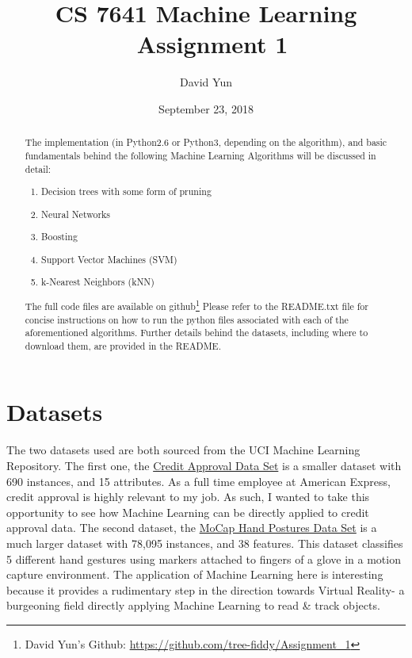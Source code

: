 \documentclass[letterpaper,12pt]{article}
\begin{document}
\title{CS 7641 Machine Learning \\
		\ Assignment 1 }
\author{David Yun}
\date{September 23, 2018}
\maketitle

\begin{abstract}
  The implementation (in Python2.6 or Python3, depending on the algorithm), and basic fundamentals behind the following Machine Learning Algorithms will be discussed in detail:  
  \begin{enumerate}
    \item Decision trees with some form of pruning
    \item Neural Networks
    \item Boosting
    \item Support Vector Machines (SVM)
    \item k-Nearest Neighbors (kNN)
      
    \end{enumerate}

    The full code files are available on github\footnote{David Yun's Github: \url{https://github.com/tree-fiddy/Assignment_1}}
    Please refer to the README.txt file for concise instructions on how to run the python files associated with each of the aforementioned algorithms.  Further details behind the datasets, including where to download them, are provided in the README.  

\end{abstract}

\tableofcontents

\section{Datasets}
The two datasets used are both sourced from the UCI Machine Learning Repository.  The first one, the \href{http://archive.ics.uci.edu/ml/datasets/credit+approval}{Credit Approval Data Set} is a smaller dataset with 690 instances, and 15 attributes.  As a full time employee at American Express, credit approval is highly relevant to my job.  As such, I wanted to take this opportunity to see how Machine Learning can be directly applied to credit approval data.  The second dataset, the \href{https://archive.ics.uci.edu/ml/datasets/MoCap+Hand+Postures#}{MoCap Hand Postures Data Set} is a much larger dataset with 78,095 instances, and 38 features.  This dataset classifies 5 different hand gestures using markers attached to fingers of a glove in a motion capture environment.  The application of Machine Learning here is interesting because it provides a rudimentary step in the direction towards Virtual Reality- a burgeoning field directly applying Machine Learning to read \& track objects.
\end{document}
